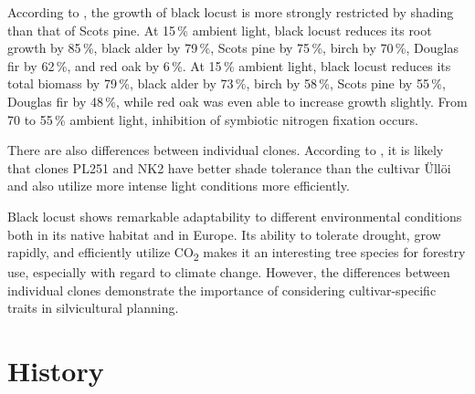 According to \citet{lyr1963beschattung,lyr1964beschattung}, the growth of black locust is more strongly restricted by shading than that of Scots pine. At 15\,\% ambient light, black locust reduces its root growth by 85\,\%, black alder by 79\,\%, Scots pine by 75\,\%, birch by 70\,\%, Douglas fir by 62\,\%, and red oak by 6\,\%. At 15\,\% ambient light, black locust reduces its total biomass by 79\,\%, black alder by 73\,\%, birch by 58\,\%, Scots pine by 55\,\%, Douglas fir by 48\,\%, while red oak was even able to increase growth slightly. From 70 to 55\,\% ambient light, inhibition of symbiotic nitrogen fixation occurs.

There are also differences between individual clones. According to \citet{abri2024lightResponse,abri2024lightResponseB}, it is likely that clones PL251 and NK2 have better shade tolerance than the cultivar Üllöi and also utilize more intense light conditions more efficiently.

Black locust shows remarkable adaptability to different environmental conditions both in its native habitat and in Europe. Its ability to tolerate drought, grow rapidly, and efficiently utilize CO\textsubscript{2} makes it an interesting tree species for forestry use, especially with regard to climate change. However, the differences between individual clones demonstrate the importance of considering cultivar-specific traits in silvicultural planning.


\section{History}


